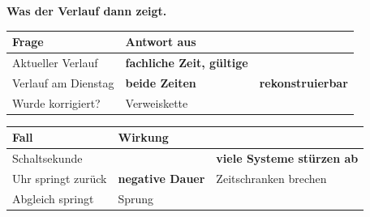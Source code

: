 \begin{aufgabe}
\begin{center}
\begin{minipage}{0.88\textwidth}
\end{minipage}
\end{center}

\textbf{Was der Verlauf dann zeigt.}

\begin{center}
\renewcommand{\arraystretch}{1.45}
\begin{tabular}{@{}P{3.0cm}P{2.2cm}P{2.8cm}@{}}
\toprule
\textbf{Frage} & \textbf{Antwort aus} & \\
\midrule
Aktueller Verlauf & \textbf{fachliche Zeit, gültige} & \\
Verlauf am Dienstag & \textbf{beide Zeiten} & \textcolor{gruen}{\textbf{rekonstruierbar}}\\
Wurde korrigiert? & Verweiskette & \\
\bottomrule
\end{tabular}
\end{center}

\begin{center}
\end{center}

\begin{warnung}
\begin{center}
\renewcommand{\arraystretch}{1.5}
\begin{tabular}{@{}P{3.0cm}P{2.2cm}P{2.8cm}@{}}
\toprule
\textbf{Fall} & \textbf{Wirkung} & \\
\midrule
Schaltsekunde &  & \textcolor{akzent}{\textbf{viele Systeme stürzen ab}}\\
Uhr springt zurück & \textcolor{akzent}{\textbf{negative Dauer}} & \textcolor{akzent}{Zeitschranken brechen}\\
Abgleich springt & \textcolor{akzent}{Sprung} & \\
\bottomrule
\end{tabular}
\end{center}


\end{warnung}
\end{aufgabe}
